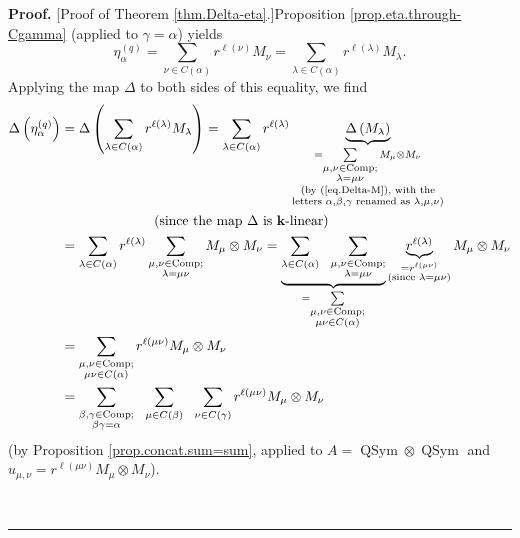 \documentclass[numbers=enddot,12pt,final,onecolumn,notitlepage]{scrartcl}%
\theoremstyle{definition}
\newenvironment{proof}[1][Proof]{\noindent\textbf{#1.} }{\ \rule{0.5em}{0.5em}}
\let\sumnonlimits\sum
\renewcommand{\sum}{\sumnonlimits\limits}
\begin{document}
\begin{proof}
[Proof of Theorem \ref{thm.Delta-eta}.]Proposition
\ref{prop.eta.through-Cgamma} (applied to $\gamma=\alpha$) yields%
\[
\eta_{\alpha}^{\left(  q\right)  }=\sum_{\nu\in C\left(  \alpha\right)
}r^{\ell\left(  \nu\right)  }M_{\nu}=\sum_{\lambda\in C\left(  \alpha\right)
}r^{\ell\left(  \lambda\right)  }M_{\lambda}.
\]
Applying the map $\Delta$ to both sides of this equality, we find%
\begin{align}
\Delta\left(  \eta_{\alpha}^{\left(  q\right)  }\right)   &  =\Delta\left(
\sum_{\lambda\in C\left(  \alpha\right)  }r^{\ell\left(  \lambda\right)
}M_{\lambda}\right)  =\sum_{\lambda\in C\left(  \alpha\right)  }r^{\ell\left(
\lambda\right)  }\underbrace{\Delta\left(  M_{\lambda}\right)  }%
_{\substack{=\sum_{\substack{\mu,\nu\in\operatorname*{Comp};\\\lambda=\mu\nu
}}M_{\mu}\otimes M_{\nu}\\\text{(by (\ref{eq.Delta-M}), with the}%
\\\text{letters }\alpha,\beta,\gamma\text{ renamed as }\lambda,\mu,\nu
\text{)}}}\nonumber\\
&  \ \ \ \ \ \ \ \ \ \ \ \ \ \ \ \ \ \ \ \ \left(  \text{since the map }%
\Delta\text{ is }\mathbf{k}\text{-linear}\right) \nonumber\\
&  =\sum_{\lambda\in C\left(  \alpha\right)  }r^{\ell\left(  \lambda\right)
}\sum_{\substack{\mu,\nu\in\operatorname*{Comp};\\\lambda=\mu\nu}}M_{\mu
}\otimes M_{\nu}=\underbrace{\sum_{\lambda\in C\left(  \alpha\right)
}\ \ \sum_{\substack{\mu,\nu\in\operatorname*{Comp};\\\lambda=\mu\nu}}}%
_{=\sum_{\substack{\mu,\nu\in\operatorname*{Comp};\\\mu\nu\in C\left(
\alpha\right)  }}}\underbrace{r^{\ell\left(  \lambda\right)  }}%
_{\substack{=r^{\ell\left(  \mu\nu\right)  }\\\text{(since }\lambda=\mu
\nu\text{)}}}M_{\mu}\otimes M_{\nu}\nonumber\\
&  =\sum_{\substack{\mu,\nu\in\operatorname*{Comp};\\\mu\nu\in C\left(
\alpha\right)  }}r^{\ell\left(  \mu\nu\right)  }M_{\mu}\otimes M_{\nu
}\nonumber\\
&  =\sum_{\substack{\beta,\gamma\in\operatorname*{Comp};\\\beta\gamma=\alpha
}}\ \ \sum_{\mu\in C\left(  \beta\right)  }\ \ \sum_{\nu\in C\left(
\gamma\right)  }r^{\ell\left(  \mu\nu\right)  }M_{\mu}\otimes M_{\nu}
\label{pf.thm.Delta-eta.LHS}%
\end{align}
(by Proposition \ref{prop.concat.sum=sum}, applied to $A=\operatorname*{QSym}%
\otimes\operatorname*{QSym}$ and $u_{\mu,\nu}=r^{\ell\left(  \mu\nu\right)
}M_{\mu}\otimes M_{\nu}$).


\end{proof}
\end{document}
